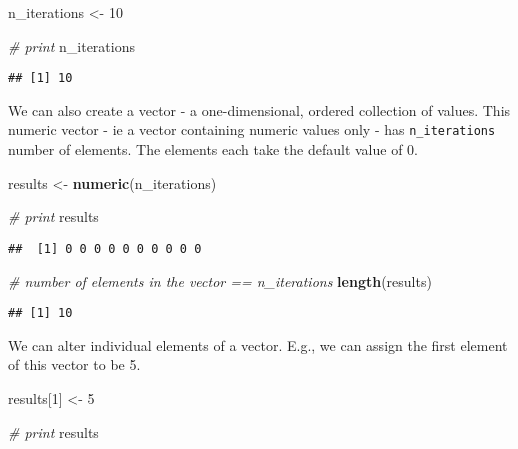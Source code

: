 \documentclass[
]{article}
\newenvironment{Shaded}{\begin{snugshade}}{\end{snugshade}}
\newcommand{\CommentTok}[1]{\textcolor[rgb]{0.56,0.35,0.01}{\textit{#1}}}
\newcommand{\DecValTok}[1]{\textcolor[rgb]{0.00,0.00,0.81}{#1}}
\newcommand{\FunctionTok}[1]{\textcolor[rgb]{0.13,0.29,0.53}{\textbf{#1}}}
\newcommand{\NormalTok}[1]{#1}
\newcommand{\OtherTok}[1]{\textcolor[rgb]{0.56,0.35,0.01}{#1}}
\begin{document}
\begin{Shaded}
\begin{Highlighting}[]
\NormalTok{n\_iterations }\OtherTok{\textless{}{-}} \DecValTok{10} 

\CommentTok{\# print}
\NormalTok{n\_iterations}
\end{Highlighting}
\end{Shaded}

\begin{verbatim}
## [1] 10
\end{verbatim}

We can also create a vector - a one-dimensional, ordered collection of
values. This numeric vector - ie a vector containing numeric values only
- has \texttt{n\_iterations} number of elements. The elements each take
the default value of 0.

\begin{Shaded}
\begin{Highlighting}[]
\NormalTok{results }\OtherTok{\textless{}{-}} \FunctionTok{numeric}\NormalTok{(n\_iterations)}

\CommentTok{\# print}
\NormalTok{results}
\end{Highlighting}
\end{Shaded}

\begin{verbatim}
##  [1] 0 0 0 0 0 0 0 0 0 0
\end{verbatim}

\begin{Shaded}
\begin{Highlighting}[]
\CommentTok{\# number of elements in the vector == n\_iterations}
\FunctionTok{length}\NormalTok{(results)}
\end{Highlighting}
\end{Shaded}

\begin{verbatim}
## [1] 10
\end{verbatim}

We can alter individual elements of a vector. E.g., we can assign the
first element of this vector to be 5.

\begin{Shaded}
\begin{Highlighting}[]
\NormalTok{results[}\DecValTok{1}\NormalTok{] }\OtherTok{\textless{}{-}} \DecValTok{5}

\CommentTok{\# print}
\NormalTok{results}
\end{Highlighting}
\end{Shaded}
\end{document}
